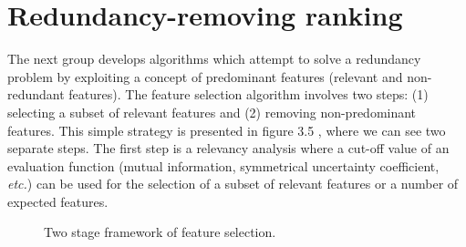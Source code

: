 \documentclass[a4paper,fleqn]{report}
\def\etal{{\em et al.\ }}
\def\etc{{\em etc.}}
\begin{document}

\newpage
\section{Redundancy-removing ranking}


The next group develops algorithms which attempt to solve a redundancy problem by exploiting a concept of predominant features 
(relevant and non-redundant features). The feature selection algorithm involves two steps: (1) selecting a subset of relevant features
and (2) removing non-predominant features. This simple strategy is presented in figure 3.5 %
, where we can see two 
separate steps. The first step is a relevancy analysis where a cut-off value of an evaluation function (mutual information, 
symmetrical uncertainty coefficient, \etc) 
can be used for the selection of a subset of relevant features or a number of expected features. 

\begin{figure}[!htbp] \label{fig:idea:rr}  %
\begin{minipage}[c]{1.0\linewidth}
\centering
{}
\end{minipage}
\caption{Two stage framework of feature selection.} 
\end{figure}
\end{document}
